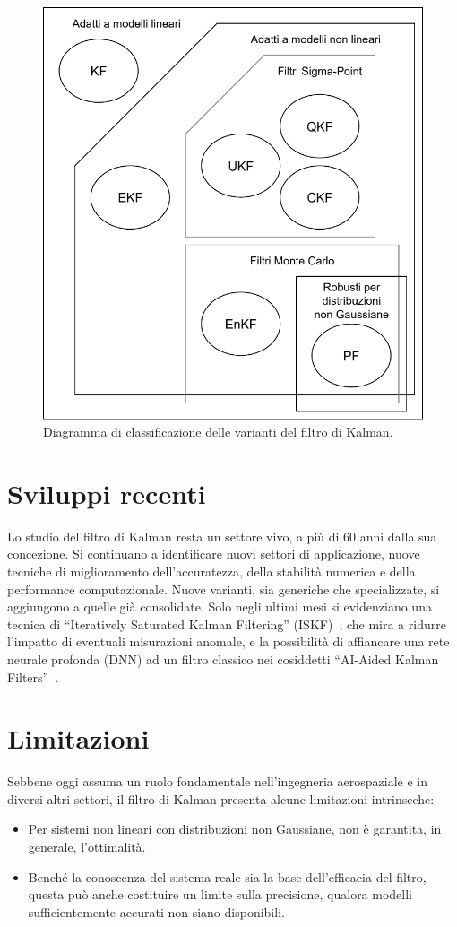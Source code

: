 \documentclass[12pt,a4paper,openright,twoside]{book}
\begin{document}
\begin{figure}
    \centering
    \includegraphics[width=.7\linewidth]{figures/variants-diagram.pdf}
    \caption{Diagramma di classificazione delle varianti del filtro di Kalman.}
    \label{fig:variants-diagram}
    \vspace{2\baselineskip}
\end{figure}

\section{Sviluppi recenti}

Lo studio del filtro di Kalman resta un settore vivo, a più di 60 anni dalla sua concezione. Si continuano a identificare nuovi settori di applicazione, nuove tecniche di miglioramento dell'accuratezza, della stabilità numerica e della performance computazionale. Nuove varianti, sia generiche che specializzate, si aggiungono a quelle già consolidate. Solo negli ultimi mesi si evidenziano una tecnica di ``Iteratively Saturated Kalman Filtering'' (ISKF)~\cite{yang2025}, che mira a ridurre l'impatto di eventuali misurazioni anomale, e la possibilità di affiancare una rete neurale profonda (DNN) ad un filtro classico nei cosiddetti ``AI-Aided Kalman Filters''~\cite{shlezinger2025}.

\section{Limitazioni}

Sebbene oggi assuma un ruolo fondamentale nell'ingegneria aerospaziale e in diversi altri settori, il filtro di Kalman presenta alcune limitazioni intrinseche:
\begin{itemize}
\item Per sistemi non lineari con distribuzioni non Gaussiane, non è garantita, in generale, l'ottimalità.
\item Benché la conoscenza del sistema reale sia la base dell'efficacia del filtro, questa può anche costituire un limite sulla precisione, qualora modelli sufficientemente accurati non siano disponibili.
\end{itemize}
\end{document}
